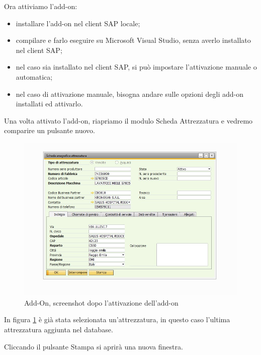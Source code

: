\newpage


	Ora attiviamo l'add-on:

\begin{itemize}
	\item installare l'add-on nel client SAP locale;
	\item compilare e farlo eseguire su Microsoft Visual Studio, senza averlo installato nel client SAP;
	\item nel caso sia installato nel client SAP, si può impostare l'attivazione manuale o automatica;
	\item nel caso di attivazione manuale, bisogna andare sulle opzioni degli add-on installati ed attivarlo.
\end{itemize} 

	
	Una volta attivato l'add-on, riapriamo il modulo Scheda Attrezzatura e vedremo comparire un pulsante nuovo.
	

\begin{figure}[!h] 
	\centering 
	\includegraphics[scale = 0.6]{immagini/add-on/addon-scheda-yesbutton.jpg} 
	\caption{Add-On, screenshot dopo l'attivazione dell'add-on}
	\label{fig:4-5}
\end{figure}

	
	In figura \ref{fig:4-5} è già stata selezionata un'attrezzatura, in questo caso l'ultima attrezzatura aggiunta nel database.
	


\newpage

\vspace{1em}

Cliccando il pulsante Stampa si aprirà una nuova finestra.

